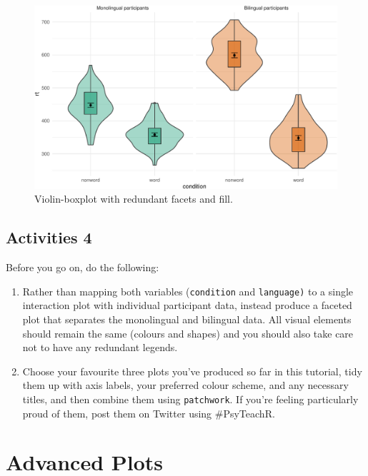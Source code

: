 \documentclass[
  english,
  doc,floatsintext]{apa6}
\begin{document}
\begin{figure}

{\centering \includegraphics[width=1\linewidth]{images/unnamed-chunk-22-1} 

}

\caption{Violin-boxplot with redundant facets and fill.}\label{fig:unnamed-chunk-22}
\end{figure}

\hypertarget{activities-4}{%
\subsection{Activities 4}\label{activities-4}}

Before you go on, do the following:

\begin{enumerate}
\def\labelenumi{\arabic{enumi}.}
\item
  Rather than mapping both variables (\texttt{condition} and \texttt{language)} to a single interaction plot with individual participant data, instead produce a faceted plot that separates the monolingual and bilingual data. All visual elements should remain the same (colours and shapes) and you should also take care not to have any redundant legends.
\item
  Choose your favourite three plots you've produced so far in this tutorial, tidy them up with axis labels, your preferred colour scheme, and any necessary titles, and then combine them using \texttt{patchwork}. If you're feeling particularly proud of them, post them on Twitter using \#PsyTeachR.
\end{enumerate}

\hypertarget{advanced-plots}{%
\section{Advanced Plots}\label{advanced-plots}}
\end{document}
